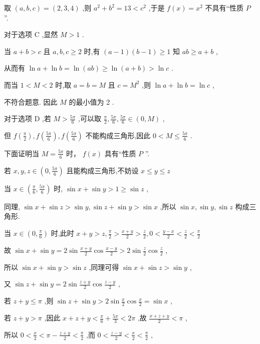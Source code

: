 \documentclass[10pt]{article}
\begin{document}
取 \(\left( {a,b,c}\right)  = \left( {2,3,4}\right)\) ,则 \({a}^{2} + {b}^{2} = {13} < {c}^{2}\) ,于是 \(f\left( x\right)  = {x}^{2}\) 不具有“性质 \(P\) ”.

对于选项 \(\mathrm{C}\) ,显然 \(M > 1\) .

当 \(a + b > c\) 且 \(a,b,c \geq  2\) 时,有 \(\left( {a - 1}\right) \left( {b - 1}\right)  \geq  1\) 知 \({ab} \geq  a + b\) ,

从而有 \(\ln a + \ln b = \ln \left( {ab}\right)  \geq  \ln \left( {a + b}\right)  > \ln c\) .

而当 \(1 < M < 2\) 时,取 \(a = b = M\) 且 \(c = {M}^{2}\) ,则 \(\ln a + \ln b = \ln c\) ,

不符合题意. 因此 \(M\) 的最小值为 2 .

对于选项 \(\mathrm{D}\) ,若 \(M > \frac{5\pi }{6}\) ,可以取 \(\frac{\pi }{2},\frac{5\pi }{6},\frac{5\pi }{6} \in  \left( {0,M}\right)\) ,

但 \(f\left( \frac{\pi }{2}\right) ,f\left( \frac{5\pi }{6}\right) ,f\left( \frac{5\pi }{6}\right)\) 不能构成三角形,因此 \(0 < M \leq  \frac{5\pi }{6}\) .

下面证明当 \(M = \frac{5\pi }{6}\) 时， \(f\left( x\right)\) 具有“性质 \(P\) ”.

若 \(x,y,z \in  \left( {0,\frac{5\pi }{6}}\right)\) 且能构成三角形,不妨设 \(x \leq  y \leq  z\)

当 \(x \in  \left( {\frac{\pi }{6},\frac{5\pi }{6}}\right)\) 时, \(\sin x + \sin y > 1 \geq  \sin z\) ,

同理, \(\sin x + \sin z > \sin y,\sin z + \sin y > \sin x\) ,所以 \(\sin x,\sin y,\sin z\) 构成三角形.

当 \(x \in  \left( {0,\frac{\pi }{6}}\right)\) 时,此时 \(x + y > z,\frac{\pi }{2} > \frac{x + y}{2} > \frac{z}{2},0 < \frac{y - x}{2} < \frac{z}{2} < \frac{\pi }{2}\)

故 \(\sin x + \sin y = 2\sin \frac{x + y}{2}\cos \frac{x - y}{2} > 2\sin \frac{z}{2}\cos \frac{z}{2}\) ,

所以 \(\sin x + \sin y > \sin z\) ,同理可得 \(\sin x + \sin z > \sin y\) ,

又 \(\sin z + \sin y = 2\sin \frac{z + y}{2}\cos \frac{z - y}{2}\) ,

若 \(z + y \leq  \pi\) ,则 \(\sin z + \sin y > 2\sin \frac{x}{2}\cos \frac{x}{2} = \sin x\) ,

若 \(z + y > \pi\) ,因此 \(x + z + y < \frac{\pi }{6} + \frac{5\pi }{3} < {2\pi }\) ,故 \(\frac{x + z + y}{2} < \pi\) ,

所以 \(0 < \frac{x}{2} < \pi  - \frac{z + y}{2} < \frac{\pi }{2}\) ,而 \(0 < \frac{z - y}{2} < \frac{x}{2} < \frac{\pi }{2}\) ,
\end{document}
